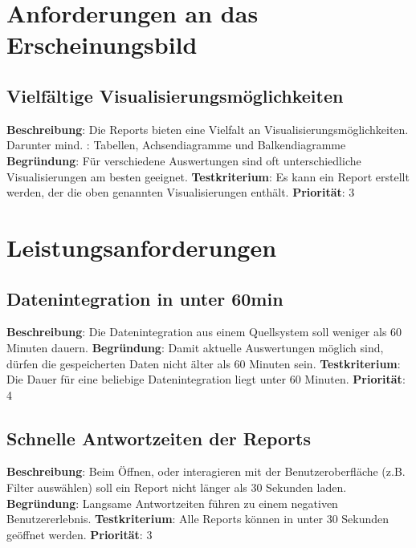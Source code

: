 \section{Anforderungen an das Erscheinungsbild} 

\subsection{Vielfältige Visualisierungsmöglichkeiten} \label{sec:anforderungsspezifikation:vielfältigeVisualisierungsmöglichkeiten}
\textbf{Beschreibung}: Die Reports bieten eine Vielfalt an Visualisierungsmöglichkeiten. Darunter mind. : Tabellen, Achsendiagramme und Balkendiagramme
\newline \textbf{Begründung}: Für verschiedene Auswertungen sind oft unterschiedliche Visualisierungen am besten geeignet.
\newline \textbf{Testkriterium}: Es kann ein Report erstellt werden, der die oben genannten Visualisierungen enthält.
\newline \textbf{Priorität}: 3

\section{Leistungsanforderungen} 

\subsection{Datenintegration in unter 60min} \label{sec:anforderungsspezifikation:SchnelleDatenintegration}
\textbf{Beschreibung}: Die Datenintegration aus einem Quellsystem soll weniger als 60 Minuten dauern.
\newline \textbf{Begründung}: Damit aktuelle Auswertungen möglich sind, dürfen die gespeicherten Daten nicht älter als 60 Minuten sein.
\newline \textbf{Testkriterium}: Die Dauer für eine beliebige Datenintegration liegt unter 60 Minuten.
\newline \textbf{Priorität}: 4

\subsection{Schnelle Antwortzeiten der Reports} \label{sec:anforderungsspezifikation:schnelleAntwortzeitenDerReports}
\textbf{Beschreibung}: Beim Öffnen, oder interagieren mit der Benutzeroberfläche (z.B. Filter auswählen) soll ein Report nicht länger als 30 Sekunden laden.
\newline \textbf{Begründung}: Langsame Antwortzeiten führen zu einem negativen Benutzererlebnis.
\newline \textbf{Testkriterium}: Alle Reports können in unter 30 Sekunden geöffnet werden.
\newline \textbf{Priorität}: 3

